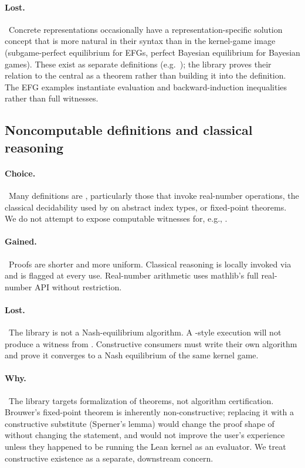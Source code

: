 \paragraph{Lost.}\ Concrete representations occasionally have a
representation-specific solution concept that is more natural in
their syntax than in the kernel-game image (subgame-perfect
equilibrium for EFGs, perfect Bayesian equilibrium for Bayesian
games).  These exist as separate definitions (e.g.\
); the library proves their relation
to the central  as a theorem rather than building it
into the definition.  The EFG examples instantiate evaluation and
backward-induction inequalities rather than full
 witnesses.

\subsection{Noncomputable definitions and classical reasoning}
\label{sec:discussion:noncomputable}

\paragraph{Choice.}\ Many definitions are ,
particularly those that invoke real-number operations, the
classical decidability used by  on abstract
index types, or fixed-point theorems.  We do not attempt to expose
computable witnesses for, e.g., \TT{mixed\_nash\_exists}.

\paragraph{Gained.}\ Proofs are shorter and more uniform.  Classical
reasoning is locally invoked via \TT{open Classical in} and is
flagged at every use.  Real-number arithmetic uses mathlib's full
real-number API without restriction.

\paragraph{Lost.}\ The library is not a Nash-equilibrium algorithm.
A \TT{\#eval}-style execution will not produce a witness from
.  Constructive consumers must write their
own algorithm and prove it converges to a Nash equilibrium of the
same kernel game.

\paragraph{Why.}\ The library targets formalization of theorems,
not algorithm certification.  Brouwer's fixed-point theorem is
inherently non-constructive; replacing it with a constructive
substitute (Sperner's lemma) would change the proof shape of
 without changing the statement, and would
not improve the user's experience unless they happened to be
running the Lean kernel as an evaluator.  We treat constructive
existence as a separate, downstream concern.

